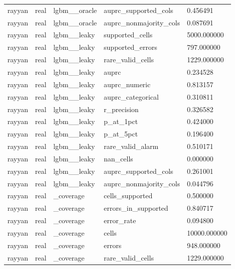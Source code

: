 \begin{tabular}{lllll}
rayyan & real & lgbm\_\_oracle & auprc\_supported\_cols & 0.456491 \\
rayyan & real & lgbm\_\_oracle & auprc\_nonmajority\_cols & 0.087691 \\
rayyan & real & lgbm\_\_leaky & supported\_cells & 5000.000000 \\
rayyan & real & lgbm\_\_leaky & supported\_errors & 797.000000 \\
rayyan & real & lgbm\_\_leaky & rare\_valid\_cells & 1229.000000 \\
rayyan & real & lgbm\_\_leaky & auprc & 0.234528 \\
rayyan & real & lgbm\_\_leaky & auprc\_numeric & 0.813157 \\
rayyan & real & lgbm\_\_leaky & auprc\_categorical & 0.310811 \\
rayyan & real & lgbm\_\_leaky & r\_precision & 0.326582 \\
rayyan & real & lgbm\_\_leaky & p\_at\_1pct & 0.424000 \\
rayyan & real & lgbm\_\_leaky & p\_at\_5pct & 0.196400 \\
rayyan & real & lgbm\_\_leaky & rare\_valid\_alarm & 0.510171 \\
rayyan & real & lgbm\_\_leaky & nan\_cells & 0.000000 \\
rayyan & real & lgbm\_\_leaky & auprc\_supported\_cols & 0.261001 \\
rayyan & real & lgbm\_\_leaky & auprc\_nonmajority\_cols & 0.044796 \\
rayyan & real & \_coverage & cells\_supported & 0.500000 \\
rayyan & real & \_coverage & errors\_in\_supported & 0.840717 \\
rayyan & real & \_coverage & error\_rate & 0.094800 \\
rayyan & real & \_coverage & cells & 10000.000000 \\
rayyan & real & \_coverage & errors & 948.000000 \\
rayyan & real & \_coverage & rare\_valid\_cells & 1229.000000 \\
\hline
\end{tabular}
